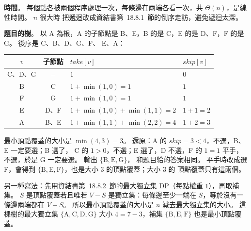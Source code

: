 \begin{pastsoln}
\textbf{時間}。 每個點各被兩個程序處理一次，每條邊在兩端各看一次，共 $\Theta(n)$，是線性時間。 $n$ 很大時
把遞迴改成資結書第~18.8.1~節的倒序走訪，避免遞迴太深。

\textbf{題目的樹}。 以 A 為根，A 的子節點是 B、E，B 的是 C，E 的是 D、F，F 的是 G。 後序是 C、B、D、G、F、
E、A：
\begin{center}
\small
\begin{tabular}{ccll}
\toprule
$v$ & 子節點 & $\mathit{take}[v]$ & $\mathit{skip}[v]$ \\
\midrule
C、D、G & -- & $1$ & $0$ \\
B & C & $1 + \min(1, 0) = 1$ & $1$ \\
F & G & $1 + \min(1, 0) = 1$ & $1$ \\
E & D、F & $1 + \min(1, 0) + \min(1, 1) = 2$ & $1 + 1 = 2$ \\
A & B、E & $1 + \min(1, 1) + \min(2, 2) = 4$ & $1 + 2 = 3$ \\
\bottomrule
\end{tabular}
\end{center}
最小頂點覆蓋的大小是 $\min(4, 3) = 3$。 還原：A 的 $\mathit{skip} = 3 < 4$，不選，B、E 一定要選；B 選了，
C 的 $1 > 0$，不選；E 選了，D 不選，F 的 $1 = 1$ 平手，不選，於是 G 一定要選。 輸出 $\{\mathrm{B, E, G}\}$，
和題目給的答案相同。 平手時改成選 F，會得到 $\{\mathrm{B, E, F}\}$，也是大小 $3$ 的頂點覆蓋；大小 $3$ 的
頂點覆蓋只有這兩個。

另一種寫法：先用資結書第~18.8.2~節的最大獨立集 DP（每點權重 $1$），再取補集。 $S$ 是頂點覆蓋若且唯若
$V - S$ 是獨立集：每條邊至少一端在 $S$，等於沒有一條邊兩端都在 $V - S$。 所以最小頂點覆蓋的大小是
$n$ 減去最大獨立集的大小。 這棵樹的最大獨立集 $\{\mathrm{A, C, D, G}\}$ 大小 $4 = 7 - 3$，補集
$\{\mathrm{B, E, F}\}$ 也是最小頂點覆蓋。
\end{pastsoln}
